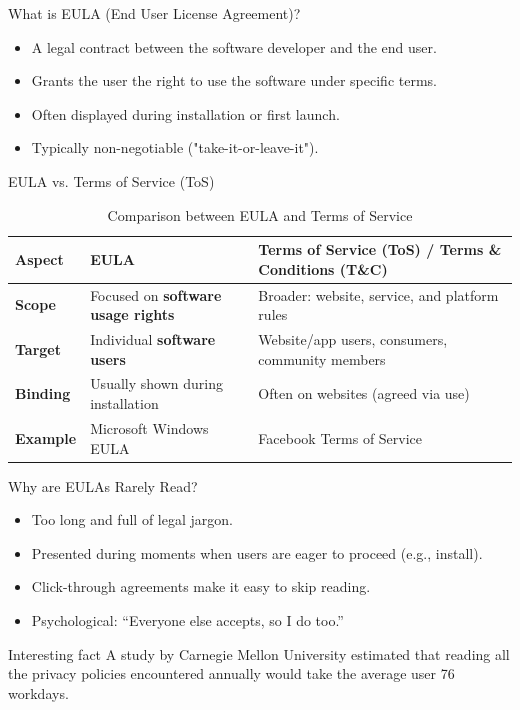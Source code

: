 
\begin{frame}{What is EULA (End User License Agreement)?}
  \begin{itemize}
    \item A legal contract between the software developer and the end user.
    \item Grants the user the right to use the software under specific terms.
    \item Often displayed during installation or first launch.
    \item Typically non-negotiable ("take-it-or-leave-it")\cite{DEFINITION}.
  \end{itemize}
\end{frame}

\begin{frame}{EULA vs. Terms of Service (ToS)}
  \begin{table}[h!]
    \centering
    \begin{tabular}{|l|p{5cm}|p{7cm}|}
    \hline
    \textbf{Aspect} & \textbf{EULA} & \textbf{Terms of Service (ToS) / Terms \& Conditions (T\&C)} \\
    \hline
    \textbf{Scope} & Focused on \textbf{software usage rights} & Broader: website, service, and platform rules \\
    \hline
    \textbf{Target} & Individual \textbf{software users} & Website/app users, consumers, community members \\
    \hline
    \textbf{Binding} & Usually shown during installation & Often on websites (agreed via use) \\
    \hline
    \textbf{Example} & Microsoft Windows EULA & Facebook Terms of Service \\
    \hline
    \end{tabular}
    \caption{Comparison between EULA and Terms of Service\cite{TOS}}
  \end{table}
\end{frame}

\begin{frame}{Why are EULAs Rarely Read?}
    \begin{itemize}
      \item Too long and full of legal jargon.
      \item Presented during moments when users are eager to proceed (e.g., install).
      \item Click-through agreements make it easy to skip reading.
      \item Psychological: “Everyone else accepts, so I do too.”\cite{RARE}
    \end{itemize}
    \begin{alertblock}{Interesting fact}
      A study by Carnegie Mellon University estimated that reading all the privacy policies encountered annually would take the average user 76 workdays\cite{FACT}.
    \end{alertblock}
\end{frame}

